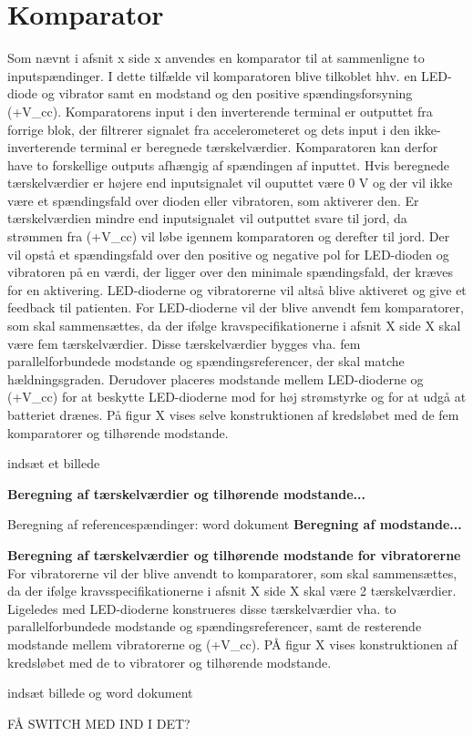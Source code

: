 \section{Komparator}
Som nævnt i afsnit x side x anvendes en komparator til at sammenligne to inputspændinger. %
I dette tilfælde vil komparatoren blive tilkoblet hhv. en LED-diode og vibrator samt en modstand og den positive spændingsforsyning (+V_{cc}). Komparatorens input i den inverterende terminal er outputtet fra forrige blok, der filtrerer signalet fra accelerometeret og dets input i den ikke-inverterende terminal er beregnede tærskelværdier. Komparatoren kan derfor have to forskellige outputs afhængig af spændingen af inputtet. Hvis beregnede tærskelværdier er højere end inputsignalet vil ouputtet være 0 V og der vil ikke være et spændingsfald over dioden eller vibratoren, som aktiverer den. Er tærskelværdien mindre end inputsignalet vil outputtet svare til jord, da strømmen fra (+V_{cc}) vil løbe igennem komparatoren og derefter til jord. Der vil opstå et spændingsfald over den positive og negative pol for LED-dioden og vibratoren på en værdi, der ligger over den minimale spændingsfald, der kræves for en aktivering. LED-dioderne og vibratorerne vil altså blive aktiveret og give et feedback til patienten. 
For LED-dioderne vil der blive anvendt fem komparatorer, som skal sammensættes, da der ifølge kravspecifikationerne i afsnit X side X skal være fem tærskelværdier. Disse tærskelværdier bygges vha. fem parallelforbundede modstande og spændingsreferencer, der skal matche hældningsgraden. Derudover placeres modstande mellem LED-dioderne og (+V_{cc}) for at beskytte LED-dioderne mod for høj strømstyrke og for at udgå at batteriet drænes. På figur X vises selve konstruktionen af kredsløbet med de fem komparatorer og tilhørende modstande.

indsæt et billede

\textbf{Beregning af tærskelværdier og tilhørende modstande...}

Beregning af referencespændinger: 
word dokument
\textbf{Beregning af modstande...}

\textbf{Beregning af tærskelværdier og tilhørende modstande for vibratorerne}
For vibratorerne vil der blive anvendt to komparatorer, som skal sammensættes, da der ifølge kravsspecifikationerne i afsnit X side X skal være 2 tærskelværdier. Ligeledes med LED-dioderne konstrueres disse tærskelværdier vha. to parallelforbundede modstande og spændingsreferencer, samt de resterende modstande mellem vibratorerne og (+V_{cc}). PÅ figur X vises konstruktionen af kredsløbet med de to vibratorer og tilhørende modstande.

indsæt billede og word dokument



FÅ SWITCH MED IND I DET? 